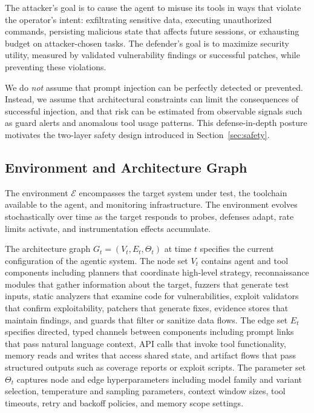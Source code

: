 \documentclass[sigconf,anonymous]{acmart}
\newcommand{\secref}[1]{Section~\ref{#1}}
\begin{document}
The attacker's goal is to cause the agent to misuse its tools in ways that violate the operator's intent: exfiltrating sensitive data, executing unauthorized commands, persisting malicious state that affects future sessions, or exhausting budget on attacker-chosen tasks. The defender's goal is to maximize security utility, measured by validated vulnerability findings or successful patches, while preventing these violations.

We do \emph{not} assume that prompt injection can be perfectly detected or prevented. Instead, we assume that architectural constraints can limit the consequences of successful injection, and that risk can be estimated from observable signals such as guard alerts and anomalous tool usage patterns. This defense-in-depth posture motivates the two-layer safety design introduced in \secref{sec:safety}.

\subsection{Environment and Architecture Graph}

The environment $\mathcal{E}$ encompasses the target system under test, the toolchain available to the agent, and monitoring infrastructure. The environment evolves stochastically over time as the target responds to probes, defenses adapt, rate limits activate, and instrumentation effects accumulate.

The architecture graph $G_t = (V_t, E_t, \Theta_t)$ at time $t$ specifies the current configuration of the agentic system. The node set $V_t$ contains agent and tool components including planners that coordinate high-level strategy, reconnaissance modules that gather information about the target, fuzzers that generate test inputs, static analyzers that examine code for vulnerabilities, exploit validators that confirm exploitability, patchers that generate fixes, evidence stores that maintain findings, and guards that filter or sanitize data flows. The edge set $E_t$ specifies directed, typed channels between components including prompt links that pass natural language context, API calls that invoke tool functionality, memory reads and writes that access shared state, and artifact flows that pass structured outputs such as coverage reports or exploit scripts. The parameter set $\Theta_t$ captures node and edge hyperparameters including model family and variant selection, temperature and sampling parameters, context window sizes, tool timeouts, retry and backoff policies, and memory scope settings.
\end{document}
